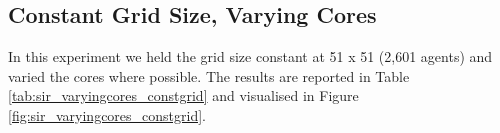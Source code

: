 \subsection{Constant Grid Size, Varying Cores}
In this experiment we held the grid size constant at 51 x 51 (2,601 agents) and varied the cores where possible. The results are reported in Table \ref{tab:sir_varyingcores_constgrid} and visualised in Figure \ref{fig:sir_varyingcores_constgrid}.

%		
%		
%		
